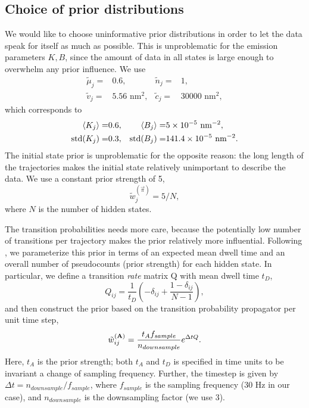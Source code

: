 \subsection{Choice of prior distributions}
We would like to choose uninformative prior distributions in order to
let the data speak for itself as much as possible. This is
unproblematic for the emission parameters $K,B$, since the amount of
data in all states is large enough to overwhelm any prior
influence. We use
\begin{align}
  \tilde\mu_j=&0.6, &
  \tilde n_j=&1,\\
  \tilde v_j =&5.56\text{ nm$^2$},&
  \tilde c_j=&30000\text{ nm$^2$},
\end{align}
which corresponds to 
\begin{align}
  \left\langle K_j\right\rangle=&0.6,&
  \left\langle B_j\right\rangle=&5\times 10^{-5}\text{ nm$^{-2}$},\\
  \mathrm{std}(K_j)=&0.3,&
  \mathrm{std}(B_j)=&141.4\times 10^{-5}\text{ nm$^{-2}$}.
\end{align}
The initial state prior is unproblematic for the opposite reason: the
long length of the trajectories makes the initial state relatively
unimportant to describe the data. We use a constant prior strength of
5,
\begin{equation}
  \tilde w_j^{(\vec\pi)}=5/N,
\end{equation}
where $N$ is the number of hidden states.

The transition probabilities needs more care, because the potentially
low number of transitions per trajectory makes the prior relatively
more influential.  Following \citet{persson2013}, we parameterize this
prior in terms of an expected mean dwell time and an overall number of
pseudocounts (prior strength) for each hidden state.  In particular,
we define a transition \textit{rate} matrix Q with mean dwell time
$t_D$,
\begin{equation}
  Q_{ij}=\frac{1}{t_D}\left(-\delta_{ij}
  +\frac{1-\delta_{ij}}{N-1}\right),
\end{equation}
and then construct the prior based on the transition probability
propagator per unit time step,
\begin{equation}
  \tilde w_{ij}^{(\mathbf{A})}=\frac{t_Af_{sample}}{n_{downsample}}
  e^{\Delta tQ}.
\end{equation}
Here, $t_A$ is the prior strength; both $t_A$ and $t_D$ is specified
in time units to be invariant a change of sampling frequency. Further,
the timestep is given by $\Delta t=n_{downsample}/f_{sample}$, where
$f_{sample}$ is the sampling frequency (30 Hz in our case), and
$n_{downsample}$ is the downsampling factor (we use 3).  


